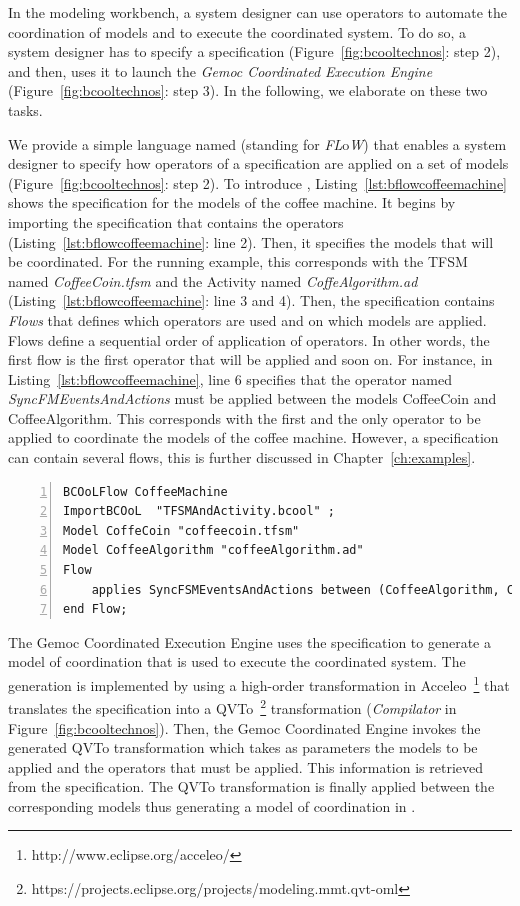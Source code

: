 In the modeling workbench, a system designer can use \bcool operators to automate the coordination of models and to execute the coordinated system. To do so, a system designer has to specify a \bflow specification (Figure~\ref{fig:bcooltechnos}: step 2), and then, uses it to launch the \emph{Gemoc Coordinated Execution Engine} (Figure~\ref{fig:bcooltechnos}: step 3). In the following, we elaborate on these two tasks.  

We provide a simple language named \bflow (standing for \bcool \emph{FL}o\emph{W}) that enables a system designer to specify how operators of a \bcool specification are applied on a set of models (Figure~\ref{fig:bcooltechnos}: step 2). To introduce \bflow, Listing~\ref{lst:bflowcoffeemachine} shows the specification for the models of the coffee machine. It begins by importing the \bcool specification that contains the operators (Listing~\ref{lst:bflowcoffeemachine}: line 2). Then, it specifies the models that will be coordinated. For the running example, this corresponds with the TFSM named \emph{CoffeeCoin.tfsm} and the Activity named \emph{CoffeAlgorithm.ad} (Listing~\ref{lst:bflowcoffeemachine}: line 3 and 4). Then, the specification contains \emph{Flows} that defines which operators are used and on which models are applied. Flows define a sequential order of application of operators. In other words, the first flow is the first operator that will be applied and soon on. For instance, in Listing~\ref{lst:bflowcoffeemachine}, line 6 specifies that the operator named \emph{SyncFMEventsAndActions} must be applied between the models CoffeeCoin and CoffeeAlgorithm. This corresponds with the first and the only operator to be applied to coordinate the models of the coffee machine. However, a \bflow specification can contain several flows, this is further discussed in Chapter~\ref{ch:examples}.  

\begin{lstlisting}[language=bflow,
caption={\bflow specification for the models of the coffee machine},
label={lst:bflowcoffeemachine}, 
basicstyle=\scriptsize\ttfamily, backgroundcolor=\color{LGrey}, numbers=left, xleftmargin=2pt]
BCOoLFlow CoffeeMachine
ImportBCOoL  "TFSMAndActivity.bcool" ;
Model CoffeCoin "coffeecoin.tfsm"
Model CoffeeAlgorithm "coffeeAlgorithm.ad"
Flow 
	applies SyncFSMEventsAndActions between (CoffeeAlgorithm, CoffeCoin);
end Flow;
\end{lstlisting}


The Gemoc Coordinated Execution Engine uses the \bflow specification to generate a model of coordination that is used to execute the coordinated system. The generation is implemented by using a high-order transformation in Acceleo~\footnote{http://www.eclipse.org/acceleo/} that translates the \bcool specification into a QVTo~\footnote{https://projects.eclipse.org/projects/modeling.mmt.qvt-oml} transformation (\emph{Compilator} in Figure~\ref{fig:bcooltechnos}). Then, the Gemoc Coordinated Engine invokes the generated QVTo transformation which takes as parameters the models to be applied and the operators that must be applied. This information is retrieved from the \bflow specification. The QVTo transformation is finally applied between the corresponding models thus generating a model of coordination in \ccsl. 

